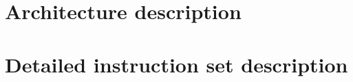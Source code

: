 \documentclass[10pt,a4paper]{book}
\begin{document}


\newpage
\thispagestyle{empty}

\


\newpage
\thispagestyle{empty}

\


\newpage
\thispagestyle{empty}

\

\tableofcontents
\listoffigures
\listoftables


\chapter{Architecture description}









% 

\chapter{Detailed instruction set description}


\newpage
\thispagestyle{empty}


\end{document}
